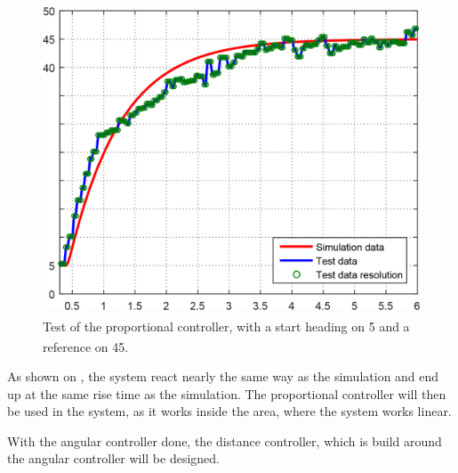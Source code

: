 \begin{figure}[H]
 	\centering
 	\includegraphics[scale=0.25]{figures/SteeringAngularTest.png}
 	\caption{Test of the proportional controller, with a start heading on \si{5^{\circ}} and a reference on \si{45^{\circ}}.}
 	\label{fig:AngularTestSim}
\end{figure}

As shown on , the system react nearly the same way as the simulation and end up at the same rise time as the simulation. The proportional controller will then be used in the system, as it works inside the area, where the system works linear. 

With the angular controller done, the distance controller, which is build around the angular controller will be designed.